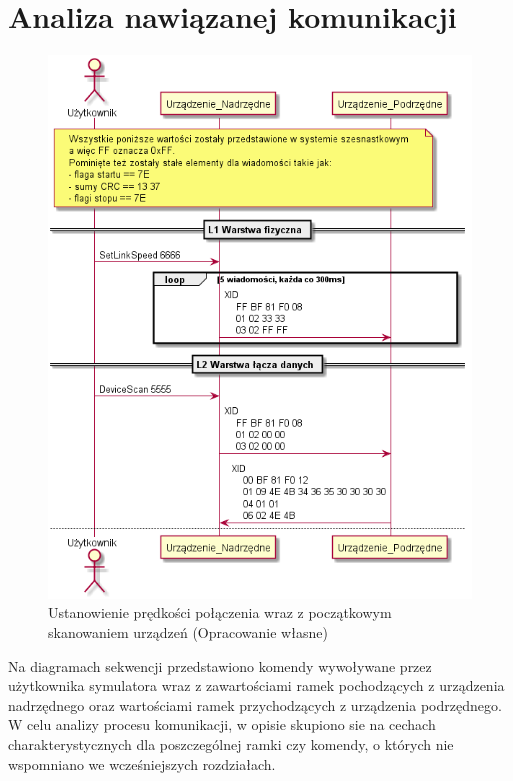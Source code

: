 \chapter{Analiza nawiązanej komunikacji}
    \begin{figure}[h!]
        \centering
        \includegraphics[scale=0.70]{out/Diagramy/UML_DiagramOfSequence_New/UML_DiagramOfSequence_New-page1.png}
        \caption{Ustanowienie prędkości połączenia wraz z początkowym skanowaniem urządzeń
            \newline(Opracowanie własne)}
        \label{fig:DiagramSequence_LinkSpeed_DeviceScan}
        \end{figure}
    \newpage

    Na diagramach sekwencji przedstawiono komendy wywoływane przez użytkownika
    symulatora wraz z zawartościami ramek pochodzących z urządzenia nadrzędnego oraz
    wartościami ramek przychodzących z urządzenia podrzędnego.
    W celu analizy procesu komunikacji, w opisie skupiono sie na cechach charakterystycznych
    dla poszczególnej ramki czy komendy, o których nie wspomniano we wcześniejszych rozdziałach.
    

